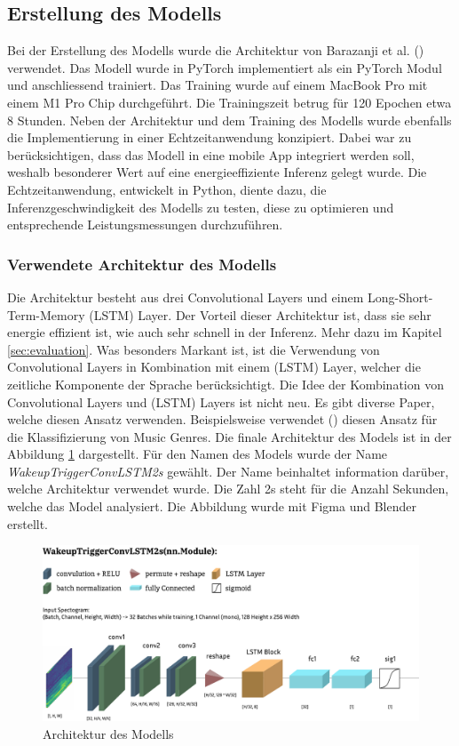 \documentclass[11pt,a4paper]{article}
\begin{document}
\newpage

\subsection{Erstellung des Modells}
Bei der Erstellung des Modells wurde die Architektur von Barazanji et al. 
(\cite{barazanji2023heyditto}) verwendet. Das Modell wurde in PyTorch implementiert als ein PyTorch 
Modul und anschliessend trainiert. Das Training wurde auf einem MacBook Pro mit einem M1 Pro Chip 
durchgeführt. Die Trainingszeit betrug für 120 Epochen etwa 8 Stunden. Neben der Architektur und 
dem Training des Modells wurde ebenfalls die Implementierung in einer Echtzeitanwendung konzipiert. 
Dabei war zu berücksichtigen, dass das Modell in eine mobile App integriert werden soll, weshalb 
besonderer Wert auf eine energieeffiziente Inferenz gelegt wurde. Die Echtzeitanwendung, entwickelt 
in Python, diente dazu, die Inferenzgeschwindigkeit des Modells zu testen, diese zu optimieren und 
entsprechende Leistungsmessungen durchzuführen.


\subsubsection{Verwendete Architektur des Modells}
Die Architektur besteht aus drei Convolutional Layers und einem Long-Short-Term-Memory 
(LSTM) Layer. Der Vorteil dieser Architektur ist, dass sie sehr energie effizient ist, wie auch sehr 
schnell in der Inferenz. Mehr dazu im Kapitel \ref{sec:evaluation}. Was besonders Markant ist, ist 
die Verwendung von Convolutional Layers in Kombination mit einem (LSTM) Layer, welcher die zeitliche 
Komponente der Sprache berücksichtigt. Die Idee der Kombination von Convolutional Layers und
(LSTM) Layers ist nicht neu. Es gibt diverse Paper, welche diesen Ansatz verwenden. Beispielsweise 
verwendet (\cite{khamees2021classifying}) diesen Ansatz für die Klassifizierung von Music Genres.
Die finale Architektur des Models ist in der Abbildung \ref{fig:model_architecture} dargestellt.
Für den Namen des Models wurde der Name \textit{WakeupTriggerConvLSTM2s} gewählt. Der Name 
beinhaltet information darüber, welche Architektur verwendet wurde. Die Zahl 2s steht für die 
Anzahl Sekunden, welche das Model analysiert. Die Abbildung wurde mit Figma und Blender erstellt.

\begin{figure}[h]
	\centering
	\includegraphics[width=1.0\linewidth]{img/model_architecture.pdf}
	\caption{Architektur des Modells}
	\label{fig:model_architecture}
\end{figure}
\end{document}
